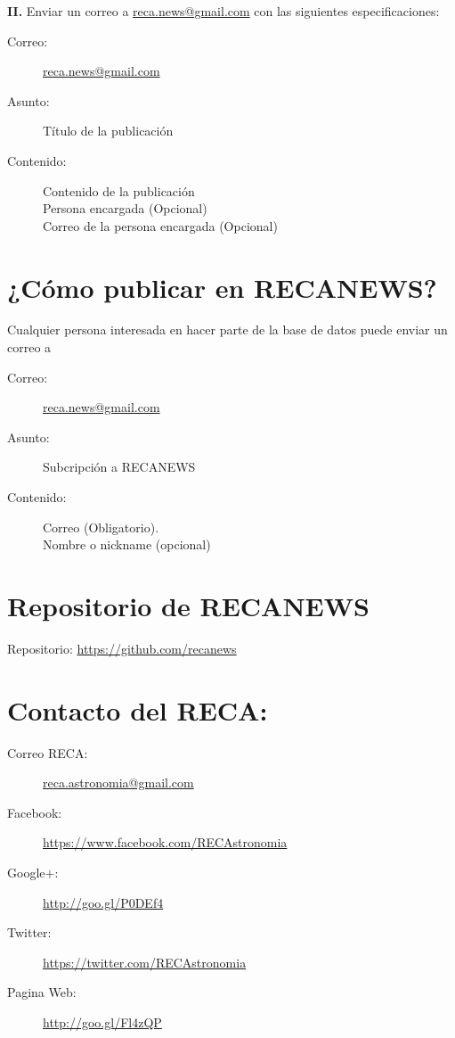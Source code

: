 \documentclass{book}
\begin{document}
\noindent \textbf{II.} Enviar un correo a \url{reca.news@gmail.com} con las siguientes especificaciones:
\begin{description}
\item[Correo:]\url{reca.news@gmail.com}
\item[Asunto:]Título de la publicación
\item[Contenido:]Contenido de la publicación\\
Persona encargada (Opcional)\\
Correo de la persona encargada (Opcional)
\end{description}
  

\section*{¿Cómo publicar en RECANEWS?}

Cualquier persona interesada en hacer parte de la base de datos puede enviar un correo a 
\begin{description}
\item[Correo:]\url{reca.news@gmail.com}
\item[Asunto:]Subcripción a RECANEWS
\item[Contenido:]Correo (Obligatorio).\\
Nombre o nickname (opcional)
\end{description}

\section*{Repositorio de RECANEWS}

Repositorio: \url{https://github.com/recanews}\\



\section*{Contacto del RECA:}

\begin{description}
\item[Correo RECA:]\url{reca.astronomia@gmail.com}
\item[Facebook:] \url{https://www.facebook.com/RECAstronomia}
\item[Google$+$:] \url{http://goo.gl/P0DEf4}
\item[Twitter:] \url{https://twitter.com/RECAstronomia}
\item[Pagina Web:] \url{http://goo.gl/Fl4zQP}
\end{description}
\end{document}
